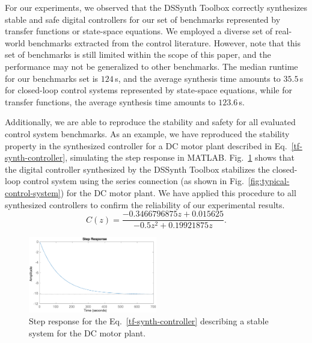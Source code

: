 \documentclass[10pt,conference]{IEEEtran}
\newcommand\tool{{DSSynth Toolbox}\xspace}
\begin{document}

For our experiments, we observed that the \tool correctly synthesizes stable and safe digital controllers 
for our set of benchmarks represented by transfer functions or state-space equations. 
We employed a diverse set of real-world benchmarks extracted from the control literature. 
However, note that this set of benchmarks is still limited within the scope of this paper, and 
the performance may not be generalized to other benchmarks. 
The median runtime for our benchmarks set is $124$\,s, and the average synthesis time amounts 
to $35.5$\,s for closed-loop control systems represented by state-space equations, while 
for transfer functions, the average synthesis time amounts to $123.6$\,s. 

Additionally, we are able to reproduce the stability and safety for all evaluated control system benchmarks.
As an example, we have reproduced the stability property in the synthesized controller 
for a DC motor plant described in Eq.~\eqref{tf-synth-controller}, simulating the step response 
in MATLAB. Fig.~\ref{tf-step-response} shows that the digital controller 
synthesized by the \tool stabilizes the closed-loop control system using 
the series connection (as shown in Fig.~\ref{fig:typical-control-system}) for the DC motor plant. 
We have applied this procedure to all synthesized controllers to confirm the reliability of our experimental results.
%
\begin{equation}
\label{tf-synth-controller}
C(z)=\frac{-0.3466796875z+0.015625}{-0.5z^{2}+0.19921875z}.
\end{equation}

\begin{figure}[ht]
  \includegraphics[width=0.5\textwidth]{tf-step-response.eps}
  \caption{Step response for the Eq.~\eqref{tf-synth-controller} describing a stable system for the DC motor plant.}
  \label{tf-step-response}
\end{figure}
\end{document}
